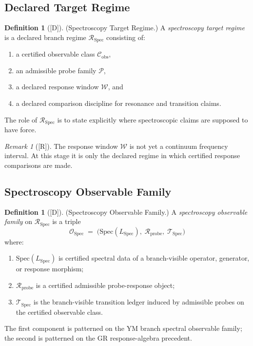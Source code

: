 \documentclass[12pt,oneside]{amsbook}
\theoremstyle{plain}
\theoremstyle{definition}
\newtheorem{definition}[theorem]{Definition}
\theoremstyle{remark}
\newtheorem{remark}[theorem]{Remark}
\newcommand{\status}[1]{\textup{[#1]}}
\begin{document}
\subsection{Declared Target Regime}\label{sec:spec-target-regime}

\begin{definition}[\status{D}]\label{def:spec-target-regime}
\textup{(Spectroscopy Target Regime.)}
A \emph{spectroscopy target regime} is a declared branch regime
$\mathcal{R}_{\mathrm{Spec}}$ consisting of:
\begin{enumerate}[label=\textup{(\arabic*)}]
 \item a certified observable class $\mathcal{C}_{\mathrm{obs}}$,
 \item an admissible probe family $\mathcal{P}$,
 \item a declared response window $\mathcal{W}$, and
 \item a declared comparison discipline for resonance and transition claims.
\end{enumerate}
The role of $\mathcal{R}_{\mathrm{Spec}}$ is to state explicitly where
spectroscopic claims are supposed to have force.
\end{definition}

\begin{remark}[\status{R}]\label{rem:spec-response-window}
The response window $\mathcal{W}$ is not yet a continuum frequency interval.
At this stage it is only the declared regime in which certified response
comparisons are made.
\end{remark}

\subsection{Spectroscopy Observable Family}\label{sec:spec-obs-family}

\begin{definition}[\status{D}]\label{def:spec-obs-family}
\textup{(Spectroscopy Observable Family.)}
A \emph{spectroscopy observable family} on $\mathcal{R}_{\mathrm{Spec}}$
is a triple
\[
 \mathcal{O}_{\mathrm{Spec}} \;=\;
 \bigl(\mathrm{Spec}(L_{\mathrm{Spec}}),\;
 \mathcal{R}_{\mathrm{probe}},\;
 \mathcal{T}_{\mathrm{Spec}}\bigr)
\]
where:
\begin{enumerate}[label=\textup{(\arabic*)}]
 \item $\mathrm{Spec}(L_{\mathrm{Spec}})$ is certified spectral data of
 a branch-visible operator, generator, or response morphism;
 \item $\mathcal{R}_{\mathrm{probe}}$ is a certified admissible
 probe-response object;
 \item $\mathcal{T}_{\mathrm{Spec}}$ is the branch-visible transition
 ledger induced by admissible probes on the certified observable class.
\end{enumerate}
The first component is patterned on the YM branch spectral observable
family; the second is patterned on the GR response-algebra precedent.
\end{definition}
\end{document}
